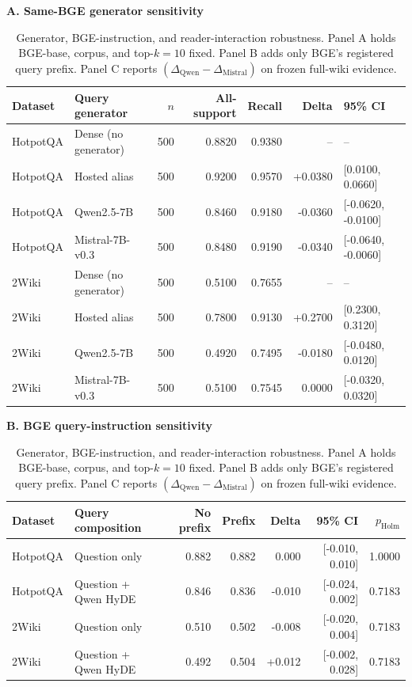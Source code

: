 \begin{table}[t]
\centering
\caption{Generator, BGE-instruction, and reader-interaction robustness. Panel A holds BGE-base, corpus, and top-$k=10$ fixed. Panel B adds only BGE's registered query prefix. Panel C reports $(\Delta_{\mathrm{Qwen}}-\Delta_{\mathrm{Mistral}})$ on frozen full-wiki evidence.}
\label{tab:generator_reader_robustness}
\scriptsize
\setlength{\tabcolsep}{3.5pt}
\textbf{A. Same-BGE generator sensitivity}\par\vspace{2pt}
\begin{tabular}{llrrrrl}
\toprule
Dataset & Query generator & $n$ & All-support & Recall & Delta & 95\% CI \\
\midrule
HotpotQA & Dense (no generator) & 500 & 0.8820 & 0.9380 & -- & -- \\
HotpotQA & Hosted alias & 500 & 0.9200 & 0.9570 & +0.0380 & [0.0100, 0.0660] \\
HotpotQA & Qwen2.5-7B & 500 & 0.8460 & 0.9180 & -0.0360 & [-0.0620, -0.0100] \\
HotpotQA & Mistral-7B-v0.3 & 500 & 0.8480 & 0.9190 & -0.0340 & [-0.0640, -0.0060] \\
\midrule
2Wiki & Dense (no generator) & 500 & 0.5100 & 0.7655 & -- & -- \\
2Wiki & Hosted alias & 500 & 0.7800 & 0.9130 & +0.2700 & [0.2300, 0.3120] \\
2Wiki & Qwen2.5-7B & 500 & 0.4920 & 0.7495 & -0.0180 & [-0.0480, 0.0120] \\
2Wiki & Mistral-7B-v0.3 & 500 & 0.5100 & 0.7545 & 0.0000 & [-0.0320, 0.0320] \\
\bottomrule
\end{tabular}

\vspace{5pt}
\textbf{B. BGE query-instruction sensitivity}\par\vspace{2pt}
\begin{tabular}{llrrrrr}
\toprule
Dataset & Query composition & No prefix & Prefix & Delta & 95\% CI & $p_{\mathrm{Holm}}$ \\
\midrule
HotpotQA & Question only & 0.882 & 0.882 & 0.000 & [-0.010, 0.010] & 1.0000 \\
HotpotQA & Question + Qwen HyDE & 0.846 & 0.836 & -0.010 & [-0.024, 0.002] & 0.7183 \\
2Wiki & Question only & 0.510 & 0.502 & -0.008 & [-0.020, 0.004] & 0.7183 \\
2Wiki & Question + Qwen HyDE & 0.492 & 0.504 & +0.012 & [-0.002, 0.028] & 0.7183 \\
\bottomrule
\end{tabular}


\end{table}

